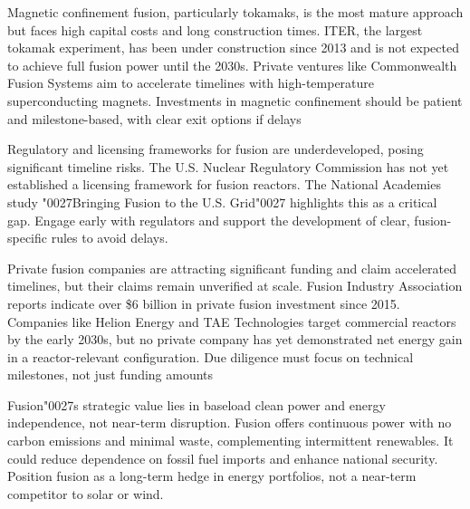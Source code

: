 \documentclass[10pt,a4paper]{article}
\newcommand{\BOApos}{{\BOQuoteFont\char"0027}}
\begin{document}
\begin{minipage}[t]{0.46\linewidth}
{\small Magnetic confinement fusion, particularly tokamaks, is the most mature approach but faces high capital costs and long construction times. ITER, the largest tokamak experiment, has been under construction since 2013 and is not expected to achieve full fusion power until the 2030s. Private ventures like Commonwealth Fusion Systems aim to accelerate timelines with high-temperature superconducting magnets. Investments in magnetic confinement should be patient and milestone-based, with clear exit options if delays}\par
{\small Regulatory and licensing frameworks for fusion are underdeveloped, posing significant timeline risks. The U.S. Nuclear Regulatory Commission has not yet established a licensing framework for fusion reactors. The National Academies study \BOApos{}Bringing Fusion to the U.S. Grid\BOApos{} highlights this as a critical gap. Engage early with regulators and support the development of clear, fusion-specific rules to avoid delays.}\par
\end{minipage}\hfill\begin{minipage}[t]{0.46\linewidth}
{\small Private fusion companies are attracting significant funding and claim accelerated timelines, but their claims remain unverified at scale. Fusion Industry Association reports indicate over \$6 billion in private fusion investment since 2015. Companies like Helion Energy and TAE Technologies target commercial reactors by the early 2030s, but no private company has yet demonstrated net energy gain in a reactor-relevant configuration. Due diligence must focus on technical milestones, not just funding amounts}\par
{\small Fusion\BOApos{}s strategic value lies in baseload clean power and energy independence, not near-term disruption. Fusion offers continuous power with no carbon emissions and minimal waste, complementing intermittent renewables. It could reduce dependence on fossil fuel imports and enhance national security. Position fusion as a long-term hedge in energy portfolios, not a near-term competitor to solar or wind.}\par
\end{minipage}
\end{document}
